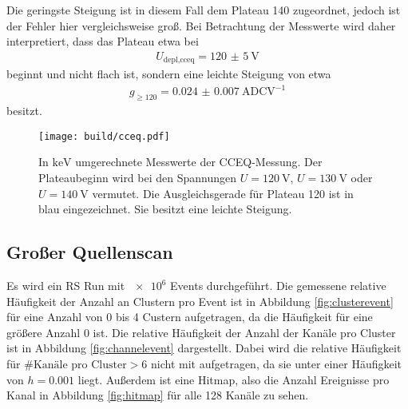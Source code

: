Die geringste Steigung ist in diesem Fall dem Plateau 140 zugeordnet, jedoch ist der Fehler hier vergleichsweise groß.
Bei Betrachtung der Messwerte wird daher interpretiert, dass das Plateau etwa bei
\begin{align}
  U_\text{depl,cceq} = \SI{120(5)}{\volt}
\end{align}
beginnt und nicht flach ist, sondern eine leichte Steigung von etwa
\begin{align}
  g_{\geq120} =  \SI{0.024(7)}{\text{ADC}\volt\tothe{-1}}
\end{align}
besitzt.

\begin{figure}
  \centering
  \texttt{[image: build/cceq.pdf]}
  \caption{In $\si{\kilo\electronvolt}$ umgerechnete Messwerte der CCEQ-Messung. Der Plateaubeginn wird bei den Spannungen $U = \SI{120}{\volt}$, $U = \SI{130}{\volt}$ oder
  $U = \SI{140}{\volt}$ vermutet. Die Ausgleichsgerade für Plateau 120 ist in blau eingezeichnet. Sie besitzt eine leichte Steigung.}
  \label{fig:cceq}
\end{figure}

\subsection{Großer Quellenscan}

Es wird ein RS Run mit $\num{e6}$ Events durchgeführt. Die gemessene relative
Häufigkeit der Anzahl an Clustern pro Event ist in Abbildung \ref{fig:clusterevent} für eine Anzahl von 0 bis 4
Custern aufgetragen, da die Häufigkeit für eine größere Anzahl 0 ist. Die relative Häufigkeit der Anzahl der Kanäle pro Cluster ist
in Abbildung \ref{fig:channelevent} dargestellt. Dabei wird die relative Häufigkeit für $\# \text{Kanäle pro Cluster} > 6$
nicht mit aufgetragen, da sie unter einer Häufigkeit von $h = 0.001$ liegt. Außerdem ist eine Hitmap, also die Anzahl
Ereignisse pro Kanal in Abbildung \ref{fig:hitmap} für alle 128 Kanäle zu sehen.

